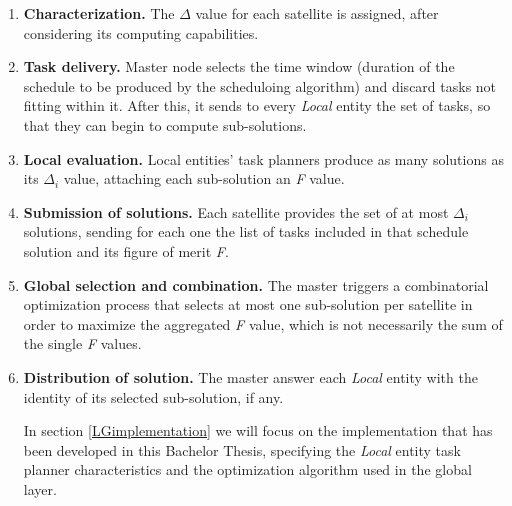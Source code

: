 \begin{enumerate}
\item \textbf{Characterization.} The $ \Delta $ value for each satellite is assigned, after considering its computing capabilities.
\item \textbf{Task delivery.} Master node selects the time window (duration of the schedule to be produced by the scheduloing algorithm) and discard tasks not fitting within it. After this, it sends to every \emph{Local} entity the set of tasks, so that they can begin to compute sub-solutions.
\item \textbf{Local evaluation.} Local entities' task planners produce as many solutions as its $ \Delta_i $ value, attaching each sub-solution an \emph{F} value.
\item \textbf{Submission of solutions.} Each satellite provides the set of at most $ \Delta_i $ solutions, sending for each one the list of tasks included in that schedule solution and its figure of merit \emph{F}.
\item \textbf{Global selection and combination.} The master triggers a combinatorial optimization process that selects at most one sub-solution per satellite in order to maximize the aggregated \emph{F} value, which is not necessarily the sum of the single \emph{F} values.
\item \textbf{Distribution of solution.} The master answer each \emph{Local} entity with the identity of its selected sub-solution, if any.

In section \ref{LGimplementation} we will focus on the implementation that has been developed in this Bachelor Thesis, specifying the \emph{Local} entity task planner characteristics and the optimization algorithm used in the global layer.
\end{enumerate}